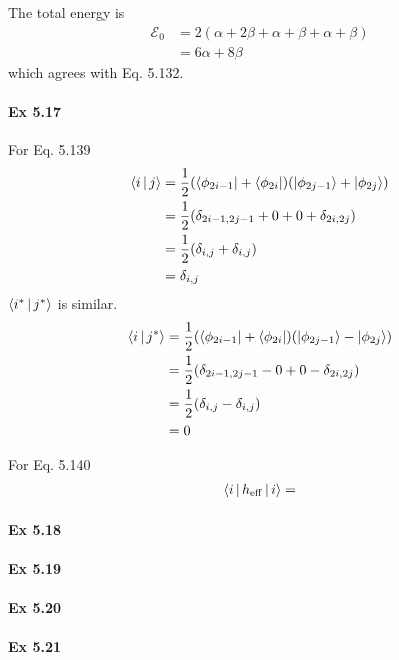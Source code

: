 \documentclass[a4paper]{article}
\DeclareMathOperator{\eff}{\mathrm{eff}}
\newcommand{\ex}[1]{\paragraph{Ex #1}}
\numberwithin{equation}{subsection}
\begin{document}
The total energy is
\begin{align}
\mathscr{E}_0 &= 2(\alpha+2\beta + \alpha+\beta + \alpha+\beta)\\
&= 6\alpha + 8\beta
\end{align}
which agrees with Eq. 5.132.

\ex{5.17}
For Eq. 5.139
\begin{align}
\Braket{i|j} &= \dfrac{1}{2}\qty(\bra{\phi_{2i-1}} + \bra{\phi_{2i}}) \qty(\ket{\phi_{2j-1}} + \ket{\phi_{2j}}) \notag\\
&= \dfrac{1}{2}\qty(\delta_{2i-1,2j-1} + 0 + 0 + \delta_{2i,2j}) \notag\\
&= \dfrac{1}{2}\qty(\delta_{i,j} + \delta_{i,j}) \notag\\
&= \delta_{i,j}
\end{align}
$ \Braket{i^*|j^*} $ is similar.
\begin{align}
\Braket{i|j^*} &= \dfrac{1}{2}\qty(\bra{\phi_{2i-1}} + \bra{\phi_{2i}}) \qty(\ket{\phi_{2j-1}} - \ket{\phi_{2j}}) \notag\\
&= \dfrac{1}{2}\qty(\delta_{2i-1,2j-1} - 0 + 0 - \delta_{2i,2j}) \notag\\
&= \dfrac{1}{2}\qty(\delta_{i,j} - \delta_{i,j}) \notag\\
&= 0
\end{align}

For Eq. 5.140
\begin{align}
\Braket{i | h_{\eff} | i} = 
\end{align}


\ex{5.18}

\ex{5.19}

\ex{5.20}

\ex{5.21}
\end{document}
